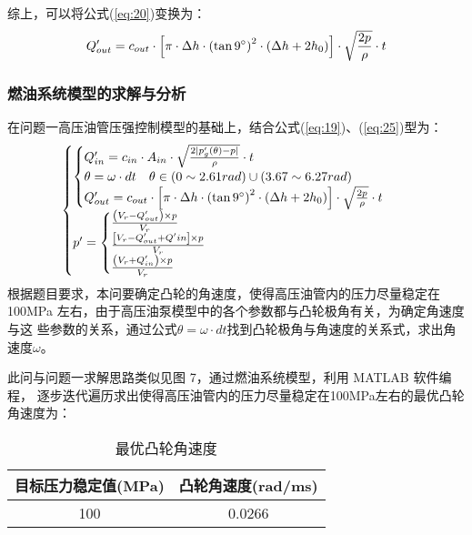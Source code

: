 \documentclass{cumcmthesis}
\begin{document}
 综上，可以将公式(\ref{eq:20})变换为：
 \begin{equation}
 Q'_{out}=c_{out}\cdot \left[\pi \cdot \Delta h \cdot \left(\tan 9\degree \right)^{2}\cdot \left(\Delta h +2h_{0}\right)\right]\cdot\sqrt{\frac{2p}{\rho}}\cdot t\label{eq:25}
 \end{equation}
\subsubsection{燃油系统模型的求解与分析}
在问题一高压油管压强控制模型的基础上，结合公式(\ref{eq:19})、(\ref{eq:25})型为\textsuperscript{\cite{bib:two}}： 
\begin{equation}
\begin{cases}
\begin{cases}
Q'_{in}=c_{in}\cdot A_{in} \cdot \sqrt{\frac {2\lvert p'_{g}\left(\theta\right)-p\rvert}{\rho}}\cdot t\\
\theta=\omega\cdot dt\quad\theta\in\left(0\sim2.61rad\right)\cup\left(3.67\sim6.27rad\right)\\
Q'_{out}=c_{out}\cdot\left[\pi\cdot\Delta h \cdot\left(\tan 9\degree\right)^{2}\cdot\left(\Delta h +2h_{0}\right)\right]\cdot\sqrt{\frac {2p}{\rho}}\cdot t\\
\end{cases}
\\
p'=\begin{cases}
\frac{\left(V_{r}-Q'_{out}\right)\times p}{V_{r}}\\
\frac{\left[V_{r}-Q'_{out}+Q'{in}\right]\times p}{V_{r}}\\
\frac{\left(V_{r}+Q'_{in}\right)\times p}{V_{r}}
\end{cases}
\end{cases}\label{eq:26}
\end{equation}
根据题目要求，本问要确定凸轮的角速度，使得高压油管内的压力尽量稳定在 100MPa 左右，由于高压油泵模型中的各个参数都与凸轮极角有关，为确定角速度与这 些参数的关系，通过公式$\theta=\omega\cdot dt$找到凸轮极角与角速度的关系式，求出角速度$\omega$。 

此问与问题一求解思路类似见图 7，通过燃油系统模型，利用 MATLAB 软件编程， 逐步迭代遍历求出使得高压油管内的压力尽量稳定在100MPa左右的最优凸轮角速度为：
\begin{table}[!htbp]
	\caption{最优凸轮角速度 }\label{tab003} \centering
	\begin{tabular}{cc}
		\toprule[1.7pt]
		目标压力稳定值(MPa) &凸轮角速度(rad/ms)\\
				\midrule[1pt]
		100& 0.0266 \\
		
		\bottomrule[1.7pt]
	\end{tabular}\label{tab:3}
\end{table}
\end{document}
